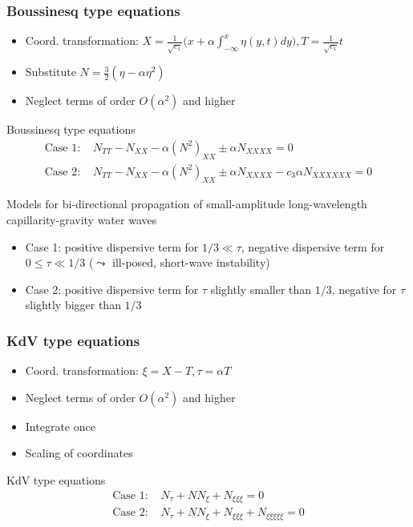 \documentclass[pdftex,10pt,intlimits]{beamer}
\begin{document}
\begin{frame}
  \frametitle{Boussinesq type equations}
  \begin{itemize}
   \item Coord. transformation: $X=\frac{1}{\sqrt{c_1}}\Big(x+\alpha\int_{-\infty}^x\eta(y,t)dy\Big),
T=\frac{1}{\sqrt{c_1}}t$
   \item Substitute $N=\frac{3}{2}(\eta-\alpha\eta^2)$
   \item Neglect terms of order $O(\alpha^2)$ and higher
  \end{itemize}
\begin{block}{Boussinesq type equations}
\begin{equation*}\begin{aligned}
\mbox{Case 1: } &N_{TT} - N_{XX} - \alpha (N^2)_{XX} \pm\alpha N_{XXXX} = 0 \\
\mbox{Case 2: } &N_{TT} - N_{XX} - \alpha (N^2)_{XX} \pm\alpha N_{XXXX} -c_3\alpha N_{XXXXXX} = 0
\end{aligned}\end{equation*}
\end{block}
Models for bi-directional propagation of small-amplitude long-wavelength capillarity-gravity water waves
  \begin{itemize}
   \item Case 1: positive dispersive term for $1/3\ll\tau$, negative dispersive term for $0\le\tau\ll 1/3$ ($\leadsto$
ill-posed, short-wave instability)
   \item Case 2: positive dispersive term for $\tau$ slightly smaller than $1/3$, negative for $\tau$
slightly bigger than $1/3$
 \end{itemize}
\end{frame}

\begin{frame}
\frametitle{KdV type equations}
  \begin{itemize}
   \item Coord. transformation: $\xi=X-T,\tau=\alpha T$
   \item Neglect terms of order $O(\alpha^2)$ and higher
   \item Integrate once
   \item Scaling of coordinates
 \end{itemize}
\begin{block}{KdV type equations}
\begin{equation*}\begin{aligned}
\mbox{Case 1: } &N_\tau + NN_\xi + N_{\xi\xi\xi} = 0 \\
\mbox{Case 2: } &N_\tau + NN_\xi + N_{\xi\xi\xi} + N_{\xi\xi\xi\xi\xi} = 0
\end{aligned}\end{equation*}
\end{block}
\end{frame}
\end{document}
